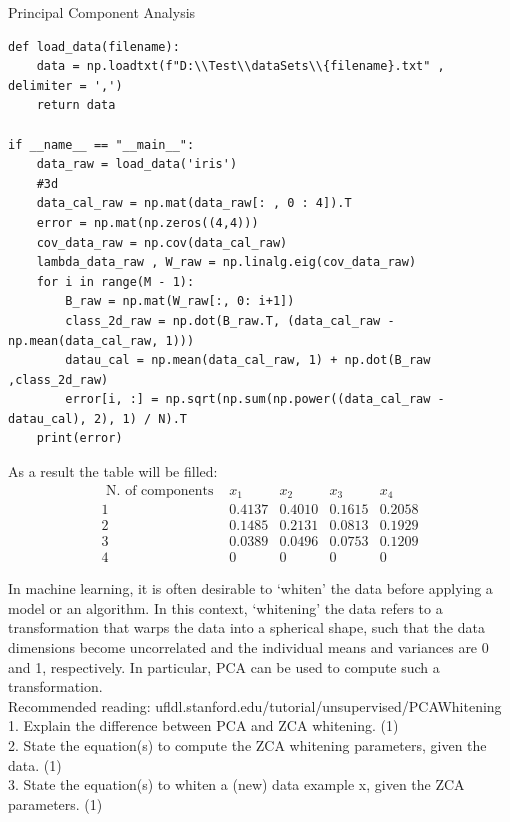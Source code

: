 \documentclass[
	ngerman,
     solution=true
	]{tudaexercise}
\begin{document}
\begin{task}{Principal Component Analysis}
\begin{subtask}[3d)]
\begin{lstlisting}
def load_data(filename):
    data = np.loadtxt(f"D:\\Test\\dataSets\\{filename}.txt" , delimiter = ',')
    return data

if __name__ == "__main__":
    data_raw = load_data('iris')
    #3d
    data_cal_raw = np.mat(data_raw[: , 0 : 4]).T
    error = np.mat(np.zeros((4,4)))
    cov_data_raw = np.cov(data_cal_raw)
    lambda_data_raw , W_raw = np.linalg.eig(cov_data_raw)
    for i in range(M - 1):
        B_raw = np.mat(W_raw[:, 0: i+1])
        class_2d_raw = np.dot(B_raw.T, (data_cal_raw - np.mean(data_cal_raw, 1)))
        datau_cal = np.mean(data_cal_raw, 1) + np.dot(B_raw ,class_2d_raw)
        error[i, :] = np.sqrt(np.sum(np.power((data_cal_raw - datau_cal), 2), 1) / N).T
    print(error)
\end{lstlisting}
As a result the table will be filled:
\[
\begin{array}{c|c|c|c|c}
\text { N. of components } & x_{1} & x_{2} & x_{3} & x_{4} \\
\hline 1 & 0.4137& 0.4010 & 0.1615 & 0.2058\\
2 & 0.1485 & 0.2131 & 0.0813 & 0.1929 \\
3 & 0.0389& 0.0496 & 0.0753&  0.1209\\
4 & 0& 0& 0&0
\end{array}
\]
\end{subtask}
\begin{subtask}[3e)]
In machine learning, it is often desirable to ‘whiten’ the data before applying a model or an algorithm. In this context,
‘whitening’ the data refers to a transformation that warps the data into a spherical shape, such that the data dimensions
become uncorrelated and the individual means and variances are 0 and 1, respectively. In particular, PCA can be used
to compute such a transformation.\\
Recommended reading: ufldl.stanford.edu/tutorial/unsupervised/PCAWhitening\\[15pt]
1. Explain the difference between PCA and ZCA whitening. (1)\\[15pt]
2. State the equation(s) to compute the ZCA whitening parameters, given the data. (1)\\[15pt]
3. State the equation(s) to whiten a (new) data example x, given the ZCA parameters. (1)\\[15pt]

\end{subtask}
\end{task}
\end{document}
